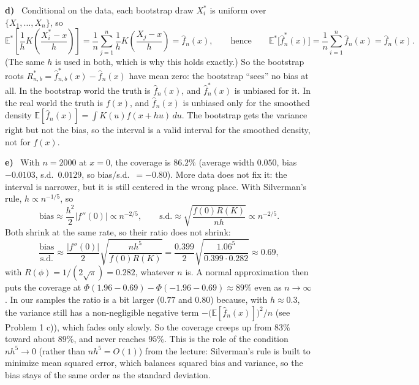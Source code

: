 \documentclass[11pt]{article}
\newcommand{\E}{\mathbb{E}}
\theoremstyle{plain}
\newcommand{\itm}[1]{\par\textbf{#1)}\ }
\begin{document}
\itm{d}
Conditional on the data, each bootstrap draw $X_i^*$ is uniform over $\{X_1,\dots,X_n\}$, so
\[
\E^*\left[\frac1hK\!\left(\frac{X_i^*-x}{h}\right)\right] = \frac1n\sum_{j=1}^n\frac1hK\!\left(\frac{X_j-x}{h}\right) = \hat f_n(x),
\qquad\text{hence}\qquad
\E^*\big[\hat f^*_n(x)\big] = \frac1n\sum_{i=1}^n\hat f_n(x) = \hat f_n(x).
\]
(The same $h$ is used in both, which is why this holds exactly.) So the bootstrap roots $R^*_{n,b}=\hat f^*_{n,b}(x)-\hat f_n(x)$ have mean zero: the bootstrap ``sees'' no bias at all. In the bootstrap world the truth is $\hat f_n(x)$, and $\hat f^*_n(x)$ is unbiased for it. In the real world the truth is $f(x)$, and $\hat f_n(x)$ is unbiased only for the smoothed density $\E[\hat f_n(x)] = \int K(u)f(x+hu)\,du$. The bootstrap gets the variance right but not the bias, so the interval is a valid interval for the smoothed density, not for $f(x)$.

\itm{e}
With $n=2000$ at $x=0$, the coverage is $86.2\%$ (average width $0.050$, bias $-0.0103$, s.d.\ $0.0129$, so bias/s.d.\ $=-0.80$). More data does not fix it: the interval is narrower, but it is still centered in the wrong place. With Silverman's rule, $h\propto n^{-1/5}$, so
\[
\text{bias}\approx\frac{h^2}{2}|f''(0)|\propto n^{-2/5},\qquad
\text{s.d.}\approx\sqrt{\frac{f(0)R(K)}{nh}}\propto n^{-2/5}.
\]
Both shrink at the same rate, so their ratio does not shrink:
\[
\frac{\text{bias}}{\text{s.d.}} \approx \frac{|f''(0)|}{2}\sqrt{\frac{nh^5}{f(0)R(K)}} = \frac{0.399}{2}\sqrt{\frac{1.06^5}{0.399\cdot 0.282}}\approx 0.69,
\]
with $R(\phi)=1/(2\sqrt\pi)=0.282$, whatever $n$ is. A normal approximation then puts the coverage at $\Phi(1.96-0.69)-\Phi(-1.96-0.69)\approx 89\%$ even as $n\to\infty$. In our samples the ratio is a bit larger ($0.77$ and $0.80$) because, with $h\approx 0.3$, the variance still has a non-negligible negative term $-\big(\E[\hat f_n(x)]\big)^2/n$ (see Problem 1 c)), which fades only slowly. So the coverage creeps up from $83\%$ toward about $89\%$, and never reaches $95\%$. This is the role of the condition $nh^5\to 0$ (rather than $nh^5=O(1)$) from the lecture: Silverman's rule is built to minimize mean squared error, which balances squared bias and variance, so the bias stays of the same order as the standard deviation.
\end{document}
